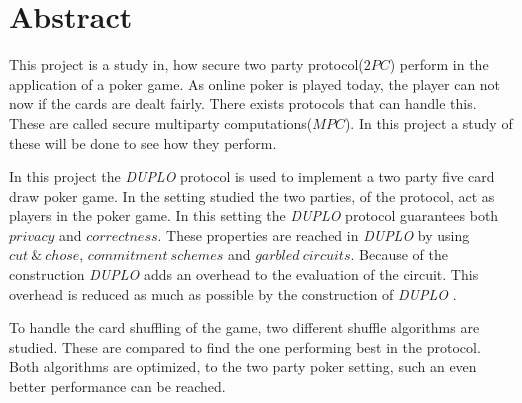 \documentclass[twoside,11pt,openright]{report}
\newcommand{\DUPLO}{\textit{DUPLO} }
\begin{document}

\pagestyle{empty} 
\vspace*{\fill}
\clearpage


\pagestyle{plain}

\chapter*{Abstract}

This project is a study in, how secure two party protocol($2PC$) perform in the application of a poker game. As online poker is played today, the player can not now if the cards are dealt fairly. There exists protocols that can handle this. These are called secure multiparty computations($MPC$). In this project a study of these will be done to see how they perform.

In this project the \DUPLO protocol is used to implement a two party five card draw poker game. In the setting studied the two parties, of the protocol, act as players in the poker game. In this setting the \DUPLO protocol guarantees both $privacy$ and $correctness$. These properties are reached in \DUPLO by using $cut~\&~chose$, $commitment~schemes$ and $garbled~circuits$. Because of the construction \DUPLO adds an overhead to the evaluation of the circuit. This overhead is reduced as much as possible by the construction of \DUPLO.

To handle the card shuffling of the game, two different shuffle algorithms are studied. These are compared to find the one performing best in the protocol. Both algorithms are optimized, to the two party poker setting, such an even better performance can be reached.
\end{document}
